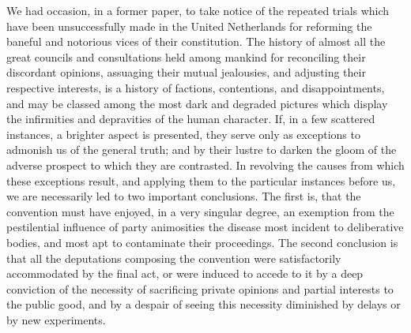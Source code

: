 We had occasion, in a former paper, to take notice of the repeated trials which have been unsuccessfully made in the United Netherlands for reforming the baneful and notorious vices of their constitution. The history of almost all the great councils and consultations held among mankind for reconciling their discordant opinions, assuaging their mutual jealousies, and adjusting their respective interests, is a history of factions, contentions, and disappointments, and may be classed among the most dark and degraded pictures which display the infirmities and depravities of the human character. If, in a few scattered instances, a brighter aspect is presented, they serve only as exceptions to admonish us of the general truth; and by their lustre to darken the gloom of the adverse prospect to which they are contrasted. In revolving the causes from which these exceptions result, and applying them to the particular instances before us, we are necessarily led to two important conclusions. The first is, that the convention must have enjoyed, in a very singular degree, an exemption from the pestilential influence of party animosities the disease most incident to deliberative bodies, and most apt to contaminate their proceedings. The second conclusion is that all the deputations composing the convention were satisfactorily accommodated by the final act, or were induced to accede to it by a deep conviction of the necessity of sacrificing private opinions and partial interests to the public good, and by a despair of seeing this necessity diminished by delays or by new experiments.


